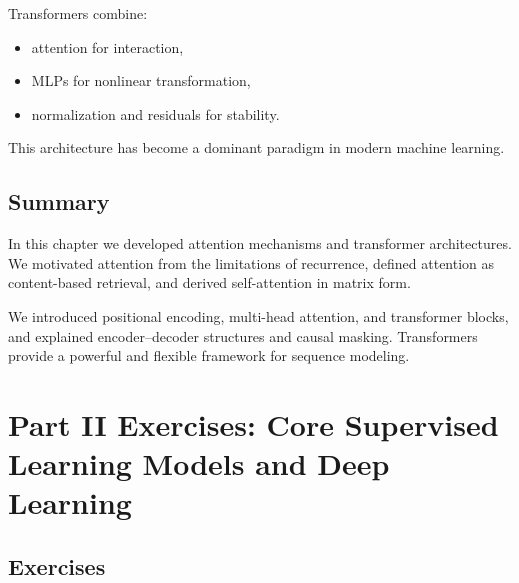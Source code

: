 Transformers combine:
\begin{itemize}
    \item attention for interaction,
    \item MLPs for nonlinear transformation,
    \item normalization and residuals for stability.
\end{itemize}

This architecture has become a dominant paradigm in modern machine learning.

\section{Summary}

In this chapter we developed attention mechanisms and transformer architectures. We motivated attention from the limitations of recurrence, defined attention as content-based retrieval, and derived self-attention in matrix form.

We introduced positional encoding, multi-head attention, and transformer blocks, and explained encoder--decoder structures and causal masking. Transformers provide a powerful and flexible framework for sequence modeling.

\chapter*{Part II Exercises: Core Supervised Learning Models and Deep Learning}

\section*{Exercises}

